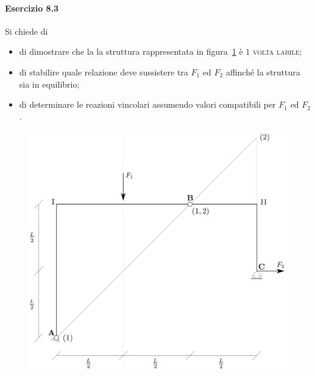 \paragraph{Esercizio 8.3}
Si chiede di
\begin{itemize}
\item di dimostrare che la la struttura rappresentata in figura~\ref{Esercizio8-3-1} è $1$ \textsc{volta labile}; 
\item di stabilire quale relazione deve sussistere tra $F_1$ ed $F_2$ affinché la struttura sia in equilibrio;
\item di determinare le reazioni vincolari assumendo valori compatibili per $F_1$ ed $F_2$.
\end{itemize}
\renewcommand{\thefigure}{8.3~-~1}
\begin{figure}[ht]
\centering
\includegraphics[width=\textwidth]{Immagini/Parte_8/Esercizio8_3/Esercizio8_3_1.pdf}
\caption{}
\label{Esercizio8-3-1}
\end{figure}
